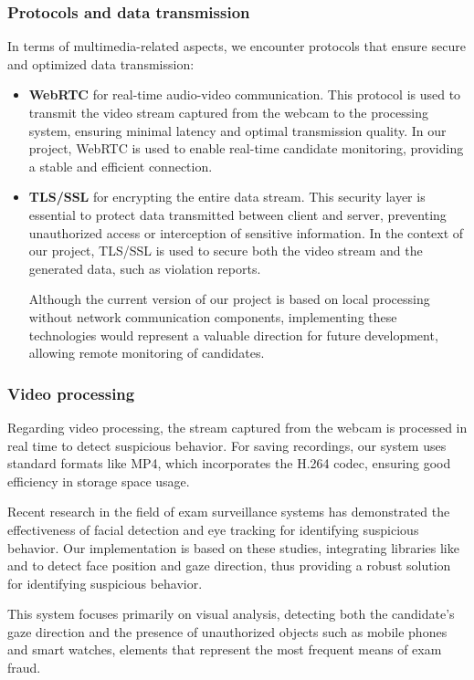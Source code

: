 \documentclass[12pt,a4paper]{article}
\let\oldtexttt\texttt
\renewcommand{\texttt}[1]{%
    \oldtexttt{\seqsplit{#1}}%
}
\begin{document}
\subsubsection{Protocols and data transmission}
In terms of multimedia-related aspects, we encounter protocols that
ensure secure and optimized data transmission:
\begin{itemize}
    \item \textbf{WebRTC} for real-time audio-video communication. This protocol is used to transmit the video stream captured from the webcam to the processing system, ensuring minimal latency and optimal transmission quality\cite{sredojev2015webrtc}. In our project, WebRTC is used to enable real-time candidate monitoring, providing a stable and efficient connection.
    \item \textbf{TLS/SSL} for encrypting the entire data stream. This security layer is essential to protect data transmitted between client and server, preventing unauthorized access or interception of sensitive information\cite{yang2018tls}. In the context of our project, TLS/SSL is used to secure both the video stream and the generated data, such as violation reports.

    Although the current version of our project is based on local processing without network communication components, implementing these technologies would represent a valuable direction for future development, allowing remote monitoring of candidates.
\end{itemize}

\subsubsection{Video processing}
Regarding video processing, the stream captured from the webcam is processed in real time to detect suspicious behavior. For saving recordings, our system uses standard formats like MP4, which incorporates the H.264 codec, ensuring good efficiency in storage space usage\cite{goodfellow2016deep}.

Recent research in the field of exam surveillance systems has demonstrated the effectiveness of facial detection and eye tracking for identifying suspicious behavior\cite{alem2021novel}. Our implementation is based on these studies, integrating libraries like \texttt{dlib} and \texttt{OpenCV} to detect face position and gaze direction, thus providing a robust solution for identifying suspicious behavior.

This system focuses primarily on visual analysis, detecting both the candidate's gaze direction and the presence of unauthorized objects such as mobile phones and smart watches, elements that represent the most frequent means of exam fraud.
\end{document}
